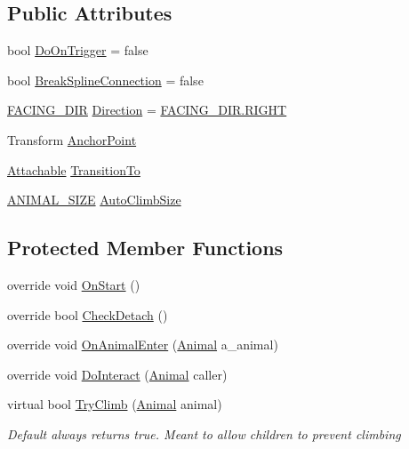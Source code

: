 \subsection*{Public Attributes}
\begin{DoxyCompactItemize}
\item 
bool \mbox{\hyperlink{class_climb_jump_a1a5693023b987aa23829b8a0377d9dc2}{Do\+On\+Trigger}} = false
\item 
bool \mbox{\hyperlink{class_climb_jump_adf154cf72f285b44e4169ae2c945134b}{Break\+Spline\+Connection}} = false
\item 
\mbox{\hyperlink{_animal_8cs_a57d10208ebba781ae206546ada2002b6}{F\+A\+C\+I\+N\+G\+\_\+\+D\+IR}} \mbox{\hyperlink{class_climb_jump_aba36d59845979b06dc89df544064a284}{Direction}} = \mbox{\hyperlink{_animal_8cs_a57d10208ebba781ae206546ada2002b6a21507b40c80068eda19865706fdc2403}{F\+A\+C\+I\+N\+G\+\_\+\+D\+I\+R.\+R\+I\+G\+HT}}
\item 
Transform \mbox{\hyperlink{class_climb_jump_a2c6a0bce88d430514c8edd50faf572a3}{Anchor\+Point}}
\item 
\mbox{\hyperlink{class_attachable}{Attachable}} \mbox{\hyperlink{class_climb_jump_a1828a3600e286c5563ff59966bdc5ee3}{Transition\+To}}
\item 
\mbox{\hyperlink{_animal_8cs_ad0d15cd79bb3e3a97e7fb817f1438fcc}{A\+N\+I\+M\+A\+L\+\_\+\+S\+I\+ZE}} \mbox{\hyperlink{class_climb_jump_ab06506a0317a9830f1dcd7b19a920cc9}{Auto\+Climb\+Size}}
\end{DoxyCompactItemize}
\subsection*{Protected Member Functions}
\begin{DoxyCompactItemize}
\item 
override void \mbox{\hyperlink{class_climb_jump_a094788a5de43e24f111eec10ba0a3c88}{On\+Start}} ()
\item 
override bool \mbox{\hyperlink{class_climb_jump_a16ddafaf15a3e7effb11ee3f433721f1}{Check\+Detach}} ()
\item 
override void \mbox{\hyperlink{class_climb_jump_a66b008bb35c83a5cf66d7f70ca0c4acf}{On\+Animal\+Enter}} (\mbox{\hyperlink{class_animal}{Animal}} a\+\_\+animal)
\item 
override void \mbox{\hyperlink{class_climb_jump_a65ed10c05b80b5b2fe2df7112546f2fc}{Do\+Interact}} (\mbox{\hyperlink{class_animal}{Animal}} caller)
\item 
virtual bool \mbox{\hyperlink{class_climb_jump_aa112e141ea3e2ddb0325f65e4171fdac}{Try\+Climb}} (\mbox{\hyperlink{class_animal}{Animal}} animal)
\begin{DoxyCompactList}\small\item\em Default always returns true. Meant to allow children to prevent climbing \end{DoxyCompactList}\end{DoxyCompactItemize}
